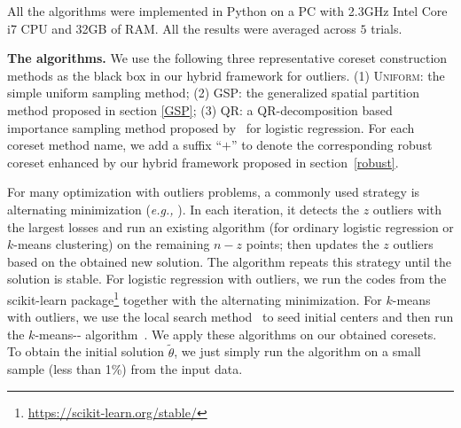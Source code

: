 \documentclass{article}
\begin{document}



All the algorithms were implemented in Python  on a PC with 2.3GHz Intel Core i7 CPU and 32GB of RAM. All the results were averaged across $ 5 $ trials.

\textbf{The algorithms.} We use the following three representative coreset construction methods as the black box in our hybrid framework for outliers. (1) \textsc{Uniform}: the simple uniform sampling method; (2) \textsc{GSP}: the generalized spatial partition method proposed in section \ref{GSP}; (3) \textsc{QR}: a QR-decomposition based importance sampling method proposed by~\cite{MunteanuSSW18} for logistic regression. For each coreset method name, we add a suffix ``$+$'' to denote the   corresponding robust coreset enhanced by our hybrid framework proposed in section~\ref{robust}. 



For many optimization with outliers problems, a commonly used strategy is alternating minimization ({\em e.g.,} \cite{Chawla2013kmeansAU}). In each iteration, it detects the $ z $ outliers with the largest losses and run an existing algorithm (for ordinary logistic regression or $k$-means clustering) on the remaining $ n-z $ points; then updates the $ z $ outliers based on the obtained new solution. The algorithm repeats this strategy until the solution is stable. For logistic regression with outliers, we run the codes from the scikit-learn package\footnote{\url{https://scikit-learn.org/stable/}} together with the alternating minimization. For $ k $-means with outliers, we use the local search method~\cite{GuptaLSM2017} to seed initial centers and then run the $ k $-means{-}{-} algorithm~\cite{Chawla2013kmeansAU}. We apply these algorithms on our obtained coresets. 
To obtain the initial solution $ \tilde{\theta} $, we just simply run the algorithm  on a small sample (less than 1\%) from the input data.
\par 
\end{document}
